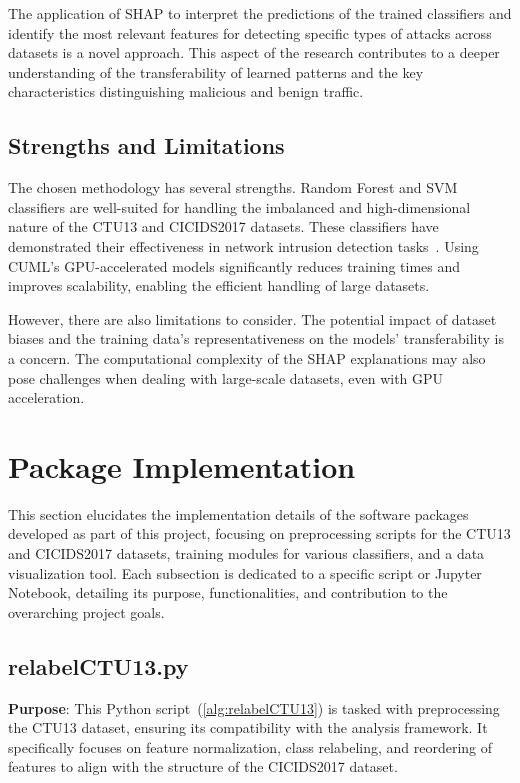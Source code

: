 The application of SHAP to interpret the predictions of the trained classifiers and identify the most relevant features for detecting specific types of attacks across datasets is a novel approach. This aspect of the research contributes to a deeper understanding of the transferability of learned patterns and the key characteristics distinguishing malicious and benign traffic.

\subsection{Strengths and Limitations}\label{subsec:strengths-limitations}
The chosen methodology has several strengths. Random Forest and SVM classifiers are well-suited for handling the imbalanced and high-dimensional nature of the CTU13 and CICIDS2017 datasets. These classifiers have demonstrated their effectiveness in network intrusion detection tasks~\cite{farnaaz2016random, teng2017svm}. Using CUML's GPU-accelerated models significantly reduces training times and improves scalability, enabling the efficient handling of large datasets.

However, there are also limitations to consider. The potential impact of dataset biases and the training data's representativeness on the models' transferability is a concern. The computational complexity of the SHAP explanations may also pose challenges when dealing with large-scale datasets, even with GPU acceleration.

\section{Package Implementation}
This section elucidates the implementation details of the software packages developed as part of this project, focusing on preprocessing scripts for the CTU13 and CICIDS2017 datasets, training modules for various classifiers, and a data visualization tool. Each subsection is dedicated to a specific script or Jupyter Notebook, detailing its purpose, functionalities, and contribution to the overarching project goals.

\subsection{relabelCTU13.py}
\textbf{Purpose}: This Python script~(\ref{alg:relabelCTU13}) is tasked with preprocessing the CTU13 dataset, ensuring its compatibility with the analysis framework. It specifically focuses on feature normalization, class relabeling, and reordering of features to align with the structure of the CICIDS2017 dataset.

